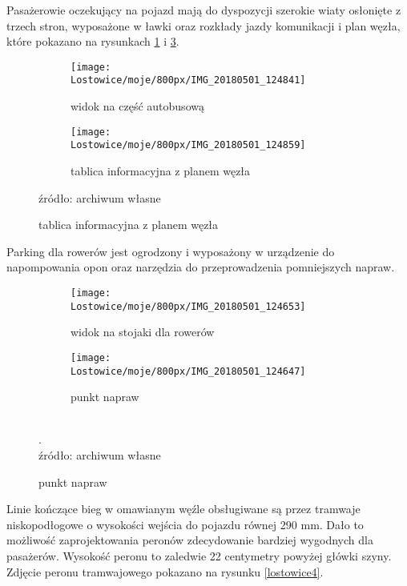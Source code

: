 \documentclass[twoside,12pt]{article}
\begin{document}
	Pasażerowie oczekujący na pojazd mają do dyspozycji szerokie wiaty osłonięte z trzech stron, wyposażone w ławki oraz rozkłady jazdy komunikacji i plan węzła, które pokazano na rysunkach \ref{lostowice5a} i \ref{lostowice5b}.
	
	\begin{figure}[H]
	\centering
	\caption{Wyposażenie wiat przystankowych}
	\begin{subfigure}{.48\textwidth}
	  \centering
	  \caption{widok na część autobusową}
	  \texttt{[image: Lostowice/moje/800px/IMG\_20180501\_124841]}
	  \label{lostowice5a}
	\end{subfigure}%
	\hfill%
	\begin{subfigure}{.48\textwidth}
	  \centering
	  \caption{tablica informacyjna z planem węzła}
	  \texttt{[image: Lostowice/moje/800px/IMG\_20180501\_124859]}
	  \label{lostowice5b}
	\end{subfigure}
	
	\footnotesize{źródło: archiwum własne}
	\end{figure}
	
	Parking dla rowerów jest ogrodzony i wyposażony w urządzenie do napompowania opon oraz narzędzia do przeprowadzenia pomniejszych napraw.
	
	\begin{figure}[H]
		\centering
		\caption{Parking rowerowy}
		\begin{subfigure}{.66\textwidth}
	  \centering
	  \caption{widok na stojaki dla rowerów}
	  \texttt{[image: Lostowice/moje/800px/IMG\_20180501\_124653]}
		\end{subfigure}%
		\hfill%
		\begin{subfigure}{.33\textwidth}
	  \centering
	  \caption{punkt napraw}
	  \texttt{[image: Lostowice/moje/800px/IMG\_20180501\_124647]}
		\end{subfigure}\\
		
		\footnotesize{. \\ źródło: archiwum własne}
	\end{figure}	
	
	Linie kończące bieg w omawianym węźle obsługiwane są przez tramwaje niskopodłogowe o wysokości wejścia do pojazdu równej 290 mm. Dało to możliwość zaprojektowania peronów zdecydowanie bardziej wygodnych dla pasażerów. Wysokość peronu to zaledwie 22 centymetry powyżej główki szyny. Zdjęcie peronu tramwajowego pokazano na rysunku \ref{lostowice4}.
	
\end{document}
